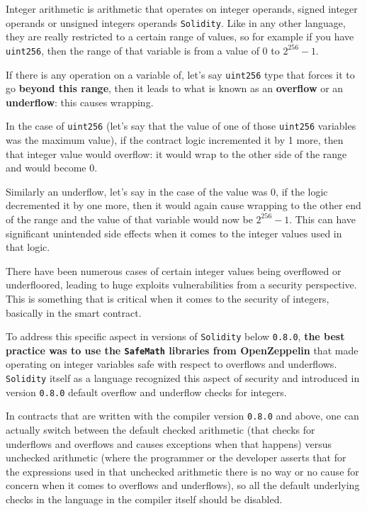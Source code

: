 Integer arithmetic is arithmetic that operates on integer operands,
signed integer operands or unsigned integers operands \texttt{Solidity}.
Like in any other language, they are really restricted to a certain
range of values, so for example if you have \texttt{uint256}, then the
range of that variable is from a value of $0$ to $2^{256} - 1$.

If there is any operation on a variable of, let's say \texttt{uint256}
type that forces it to go \textbf{beyond this range}, then it leads to
what is known as an \textbf{overflow} or an \textbf{underflow}: this
causes wrapping.

In the case of \texttt{uint256} (let's say that the value of one of
those \texttt{uint256} variables was the maximum value), if the contract
logic incremented it by 1 more, then that integer value would overflow:
it would wrap to the other side of the range and would become 0.

Similarly an underflow, let's say in the case of the value was 0, if the
logic decremented it by one more, then it would again cause wrapping to
the other end of the range and the value of that variable would now be
$2^{256} - 1$. This can have significant unintended side effects when
it comes to the integer values used in that logic.

There have been numerous cases of certain integer values being
overflowed or underfloored, leading to huge exploits vulnerabilities
from a security perspective. This is something that is critical when it
comes to the security of integers, basically in the smart contract.

To address this specific aspect in versions of \texttt{Solidity} below
\texttt{0.8.0}, \textbf{the best practice was to use the
\texttt{SafeMath} libraries from OpenZeppelin} that made operating on
integer variables safe with respect to overflows and underflows.
\texttt{Solidity} itself as a language recognized this aspect of
security and introduced in version \texttt{0.8.0} default overflow and
underflow checks for integers.

In contracts that are written with the compiler version \texttt{0.8.0}
and above, one can actually switch between the default checked
arithmetic (that checks for underflows and overflows and causes
exceptions when that happens) versus unchecked arithmetic (where the
programmer or the developer asserts that for the expressions used in
that unchecked arithmetic there is no way or no cause for concern when
it comes to overflows and underflows), so all the default underlying
checks in the language in the compiler itself should be disabled.

